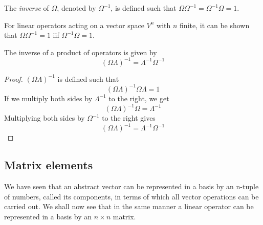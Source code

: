 \documentclass[11pt,fleqn]{book} %
\begin{document}
\begin{definition}
    The \textit{inverse} of $\Omega$, denoted by $\Omega^{-1}$, is defined such that $\Omega\Omega^{-1}=\Omega^{-1}\Omega=1$.
\end{definition}
\begin{remark}
    For linear operators acting on a vector space $V^n$ with $n$ finite, it can be shown that
    $\Omega\Omega^{-1}=1$ iif $\Omega^{-1}\Omega=1$.
\end{remark}
\begin{theorem}
    The inverse of a product of operators is given by
    \begin{equation}
        \left(\Omega\Lambda\right)^{-1} = \Lambda^{-1}\Omega^{-1}
    \end{equation}
\end{theorem}
\begin{proof}
    $\left(\Omega\Lambda\right)^{-1}$ is defined such that 
    \begin{equation*}
        \left(\Omega\Lambda\right)^{-1}\Omega\Lambda=1
    \end{equation*}
    If we multiply both sides by $\Lambda^{-1}$ to the right, we get 
    \begin{equation*}
        \left(\Omega\Lambda\right)^{-1}\Omega = \Lambda^{-1}
    \end{equation*}
    Multiplying both sides by $\Omega^{-1}$ to the right gives
    \begin{equation*}
        \left(\Omega\Lambda\right)^{-1} = \Lambda^{-1}\Omega^{-1}
    \end{equation*}
\end{proof}

\subsection{Matrix elements}
We have seen that an abstract vector can be represented in a basis by an n-tuple of numbers, called its components,
in terms of which all vector operations can be carried out.
We shall now see that in the same manner a linear operator can be represented in a basis by an $n\times n$
matrix.
\end{document}
